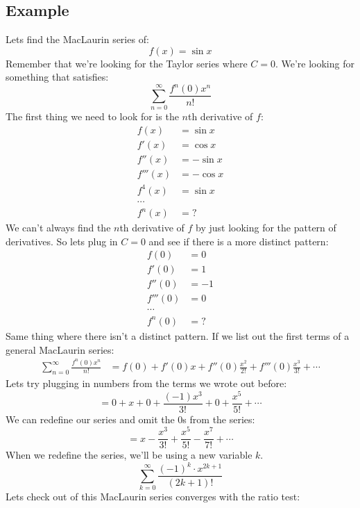 \documentclass{report}
\begin{document}
    \subsection{Example}
        Lets find the MacLaurin series of:
        \[f(x) = \sin x\]
        Remember that we're looking for the Taylor series where \(C = 0\).
        We're looking for something that satisfies:
        \[\sum_{n=0}^{\infty} \frac{f^n(0)x^n}{n!}\]
        The first thing we need to look for is the \(n\)th derivative of \(f\):
        \begin{align*}
            f(x) &= \sin x \\
            f'(x) &= \cos x \\
            f''(x) &= - \sin x \\
            f'''(x) &= - \cos x \\
            f^4(x) &= \sin x \\
            \cdots \\
            f^n(x) &= ?
        \end{align*}
        We can't always find the \(n\)th derivative of \(f\) by just looking for the pattern of derivatives.
        So lets plug in \(C = 0\) and see if there is a more distinct pattern:
        \begin{align*}
            f(0) &= 0 \\
            f'(0) &= 1 \\
            f''(0) &= -1 \\
            f'''(0) &= 0 \\
            \cdots \\
            f^n(0) &= ?
        \end{align*}
        Same thing where there isn't a distinct pattern.
        If we list out the first terms of a general MacLaurin series:
        \begin{align*}
            \sum_{n=0}^{\infty} \frac{f^n(0)x^n}{n!}
            &= f(0) + f'(0)x + f''(0) \frac{x^2}{2!} + f'''(0) \frac{x^3}{3!} + \cdots
        \end{align*}
        Lets try plugging in numbers from the terms we wrote out before:
        \[= 0 + x + 0 + \frac{(-1)x^3}{3!} + 0 + \frac{x^5}{5!} + \cdots \]
        We can redefine our series and omit the \(0\)s from the series:
        \[= x - \frac{x^3}{3!} + \frac{x^5}{5!} - \frac{x^7}{7!} + \cdots\]
        When we redefine the series, we'll be using a new variable \(k\).
        \[\sum_{k=0}^{\infty} \frac{(-1)^k \cdot x^{2k+1}}{(2k+1)!}\]
        Lets check out of this MacLaurin series converges with the ratio test:
\end{document}
